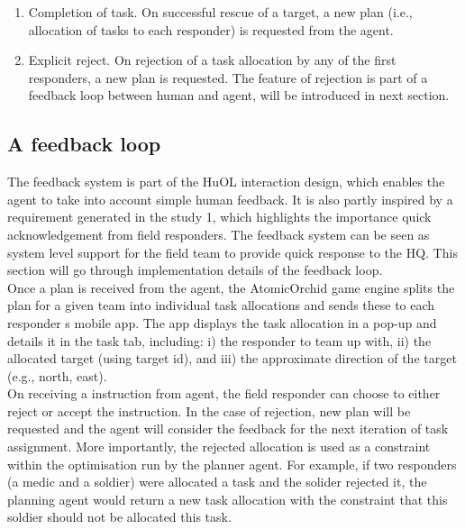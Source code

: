 \begin{enumerate}
\item Completion of task. On successful rescue of a target, a new plan (i.e., allocation of tasks to each responder) is requested from the agent.\\

\item Explicit reject. On rejection of a task allocation by any of the first responders, a new plan is requested.  The feature of rejection is part of a feedback loop between human and agent, will be introduced in next section.\\

\end{enumerate}


\subsection{A feedback loop}
The feedback system is part of the HuOL interaction design, which enables the agent to take into account simple human feedback. It is also partly inspired by a requirement generated in the study 1, which highlights the importance quick acknowledgement from field responders. The feedback system can be seen as system level support for the field team to provide quick response to the HQ. This section will go through implementation details of the feedback loop.\\

Once a plan is received from the agent, the AtomicOrchid game engine splits the plan for a given team into individual task allocations and sends these to each responder s mobile app. The app displays the task allocation in a pop-up and details it in the task tab, including: i) the responder to team up with, ii) the allocated target (using target id), and iii) the approximate direction of the target (e.g., north, east).\\

On receiving a instruction from agent, the field responder can choose to either reject or accept the instruction. In the case of rejection, new plan will be requested and the agent will consider the feedback for the next iteration of task assignment. More importantly, the rejected allocation is used as a constraint within the optimisation run by the planner agent. For example, if two responders (a medic and a soldier) were allocated a task and the solider rejected it, the planning agent would return a new task allocation with the constraint that this soldier should not be allocated this task. \\

